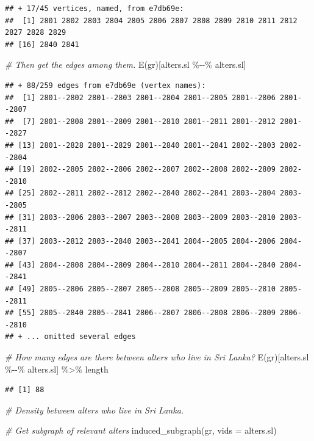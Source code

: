 \documentclass[
]{book}
\newenvironment{Shaded}{\begin{snugshade}}{\end{snugshade}}
\newcommand{\AttributeTok}[1]{\textcolor[rgb]{0.77,0.63,0.00}{#1}}
\newcommand{\CommentTok}[1]{\textcolor[rgb]{0.56,0.35,0.01}{\textit{#1}}}
\newcommand{\FunctionTok}[1]{\textcolor[rgb]{0.00,0.00,0.00}{#1}}
\newcommand{\NormalTok}[1]{#1}
\newcommand{\SpecialCharTok}[1]{\textcolor[rgb]{0.00,0.00,0.00}{#1}}
\begin{document}
\begin{verbatim}
## + 17/45 vertices, named, from e7db69e:
##  [1] 2801 2802 2803 2804 2805 2806 2807 2808 2809 2810 2811 2812 2827 2828 2829
## [16] 2840 2841
\end{verbatim}

\begin{Shaded}
\begin{Highlighting}[]
\CommentTok{\# Then get the edges among them.}
\FunctionTok{E}\NormalTok{(gr)[alters.sl }\SpecialCharTok{\%{-}{-}\%}\NormalTok{ alters.sl]}
\end{Highlighting}
\end{Shaded}

\begin{verbatim}
## + 88/259 edges from e7db69e (vertex names):
##  [1] 2801--2802 2801--2803 2801--2804 2801--2805 2801--2806 2801--2807
##  [7] 2801--2808 2801--2809 2801--2810 2801--2811 2801--2812 2801--2827
## [13] 2801--2828 2801--2829 2801--2840 2801--2841 2802--2803 2802--2804
## [19] 2802--2805 2802--2806 2802--2807 2802--2808 2802--2809 2802--2810
## [25] 2802--2811 2802--2812 2802--2840 2802--2841 2803--2804 2803--2805
## [31] 2803--2806 2803--2807 2803--2808 2803--2809 2803--2810 2803--2811
## [37] 2803--2812 2803--2840 2803--2841 2804--2805 2804--2806 2804--2807
## [43] 2804--2808 2804--2809 2804--2810 2804--2811 2804--2840 2804--2841
## [49] 2805--2806 2805--2807 2805--2808 2805--2809 2805--2810 2805--2811
## [55] 2805--2840 2805--2841 2806--2807 2806--2808 2806--2809 2806--2810
## + ... omitted several edges
\end{verbatim}

\begin{Shaded}
\begin{Highlighting}[]
\CommentTok{\# How many edges are there between alters who live in Sri Lanka?}
\FunctionTok{E}\NormalTok{(gr)[alters.sl }\SpecialCharTok{\%{-}{-}\%}\NormalTok{ alters.sl] }\SpecialCharTok{\%\textgreater{}\%} 
\NormalTok{  length}
\end{Highlighting}
\end{Shaded}

\begin{verbatim}
## [1] 88
\end{verbatim}

\begin{Shaded}
\begin{Highlighting}[]
\CommentTok{\# Density between alters who live in Sri Lanka.}

\CommentTok{\# Get subgraph of relevant alters}
\FunctionTok{induced\_subgraph}\NormalTok{(gr, }\AttributeTok{vids =}\NormalTok{ alters.sl)}
\end{Highlighting}
\end{Shaded}
\end{document}
